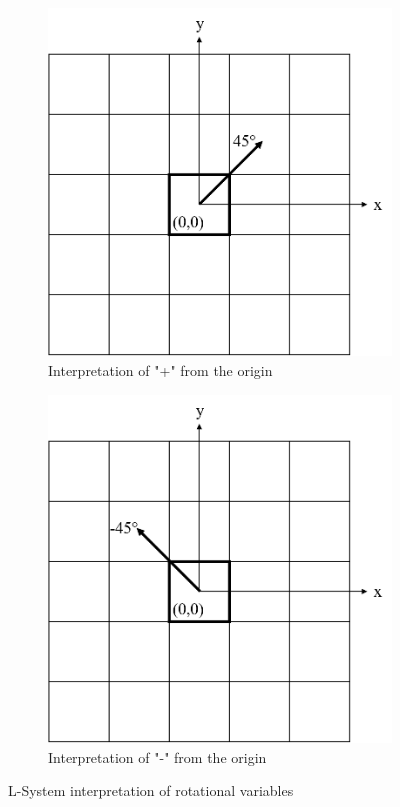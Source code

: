 \begin{figure}[H]
	\centering
	\begin{subfigure}[c]{0.4\textwidth}
		\centering
		\includegraphics[width=\textwidth]{LS+.png}
		\caption{Interpretation of "+" from the origin}
	\end{subfigure}
	\hfill
	\begin{subfigure}[c]{0.4\textwidth}
		\centering
		\includegraphics[width=\textwidth]{LS-.png}
		\caption{Interpretation of "-" from the origin}
	\end{subfigure}
	\caption[L-System rotation interpretation]{L-System interpretation of rotational variables}
	\label{fig:lsrot}
\end{figure}

